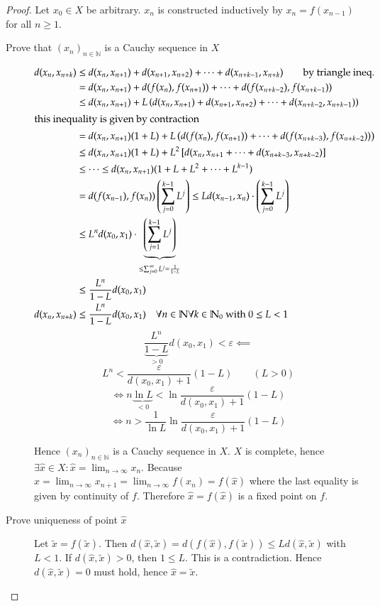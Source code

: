 \documentclass{article}
\begin{document}
\begin{proof}
  Let $x_0 \in X$ be arbitrary.
  $x_n$ is constructed inductively by $x_n = f(x_{n-1})$ for all $n \geq 1$.

  \begin{description}
    \item[Prove that $(x_n)_{n \in \mathbb N}$ is a Cauchy sequence in $X$]
      \begin{align*}
        d(x_n, x_{n+k}) &\leq d(x_n, x_{n+1}) + d(x_{n+1}, x_{n+2}) + \dots + d(x_{n+k-1}, x_{n+k}) \qquad \text{by triangle ineq.} \\
          &= d(x_n, x_{n+1}) + d(f(x_n), f(x_{n+1})) + \dots + d(f(x_{n+k-2}), f(x_{n+k-1})) \\
          &\leq d(x_n, x_{n+1}) + L\left(d(x_n, x_{n+1}) + d(x_{n+1}, x_{n+2}) + \dots + d(x_{n+k-2}, x_{n+k-1})\right) \\
      \intertext{this inequality is given by contraction}
          &= d(x_n, x_{n+1}) (1 + L) + L \left(d(f(x_n), f(x_{n+1})) + \dots + d(f(x_{n+k-3}), f(x_{n+k-2}))\right) \\
          &\leq d(x_n, x_{n+1}) (1 + L) + L^2 \left[d(x_n, x_{n+1} + \dots + d(x_{n + k - 3}, x_{n+k-2})\right] \\
          &\leq \dots \leq d(x_n, x_{n+1}) (1 + L + L^2 + \dots + L^{k-1}) \\
          &= d(f(x_{n-1}), f(x_n)) \left(\sum_{j=0}^{k-1} L^j\right) \leq L d(x_{n-1}, x_n) \cdot \left(\sum_{j=0}^{k-1} L^j\right) \\
          &\leq L^n d(x_0, x_1) \cdot \underbrace{\left(\sum_{j=1}^{k-1} L^j\right)}_{\leq \sum_{j=0}^\infty L^j = \frac{1}{1 - L}} \\
          &\leq \frac{L^n}{1 - L} d(x_0, x_1) \\
        d(x_n, x_{n+k}) &\leq \frac{L^n}{1 - L} d(x_0, x_1) \quad \forall n \in \mathbb N \forall k \in \mathbb N_0 \text{ with } 0 \leq L < 1
      \end{align*}
      \[ \frac{L^n}{\underbrace{1 - L}_{> 0}} d(x_0, x_1) < \varepsilon \impliedby \]
      \[ L^n < \frac{\varepsilon}{d(x_0, x_1) + 1} (1 - L) \qquad (L > 0) \]
      \[ \iff n \underbrace{\ln{L}}_{<0} < \ln \frac{\varepsilon}{d(x_0, x_1) + 1} (1 - L) \]
      \[ \iff n > \frac{1}{\ln{L}} \ln \frac{\varepsilon}{d(x_0, x_1) + 1} (1 - L) \]

      Hence $(x_n)_{n \in \mathbb N}$ is a Cauchy sequence in $X$. $X$ is complete, hence $\exists \hat{x} \in X: \hat{x} = \lim_{n \to \infty} x_n$.
      Because $\hat{x} = \lim_{n\to\infty} x_{n+1} = \lim_{n\to\infty} f(x_n) = f(\hat{x})$ where the last equality is given by continuity of $f$.
      Therefore $\hat{x} = f(\hat{x})$ is a fixed point on $f$.

  \item[Prove uniqueness of point $\hat{x}$]
    Let $\tilde{x} = f(\tilde{x})$. Then $d(\hat{x}, \tilde{x}) = d(f(\hat{x}), f(\tilde{x})) \leq L d(\hat{x}, \tilde{x})$ with $L < 1$.
    If $d(\hat{x}, \tilde{x}) > 0$, then $1 \leq L$. This is a contradiction.
    Hence $d(\hat{x}, \tilde{x}) = 0$ must hold, hence $\hat{x} = \tilde{x}$.
  \end{description}
\end{proof}
\end{document}
